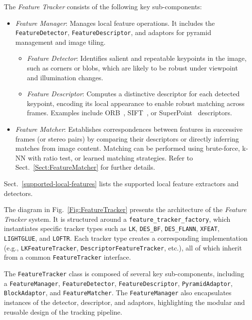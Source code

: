 \documentclass{article}
\begin{document}
The \textit{Feature Tracker} consists of the following key sub-components:

\begin{itemize} 
\item \textit{Feature Manager}: Manages local feature operations. It includes the \texttt{FeatureDetector}, \texttt{FeatureDescriptor}, and adaptors for pyramid management and image tiling. 
\begin{itemize}
\item \textit{Feature Detector}: Identifies salient and repeatable keypoints in the image, such as corners or blobs, which are likely to be robust under viewpoint and illumination changes. 

\item \textit{Feature Descriptor}: Computes a distinctive descriptor for each detected keypoint, encoding its local appearance to enable robust matching across frames. Examples include ORB~\cite{rublee2011orb}, SIFT~\cite{lowe1999object}, or SuperPoint~\cite{detone18superpoint} descriptors.

\end{itemize}

\item \textit{Feature Matcher}: Establishes correspondences between features in successive frames (or stereo pairs) by comparing their descriptors or directly inferring matches from image content. Matching can be performed using brute-force, k-NN with ratio test, or learned matching strategies. Refer to Sect.~\ref{Sect:FeatureMatcher} for further details.
\end{itemize}

Sect.~\ref{supported-local-features} lists the supported local feature extractors and detectors.

The diagram in Fig.~\ref{Fig:FeatureTracker} presents the architecture of the \textit{Feature Tracker} system. It is structured around a \texttt{feature\_tracker\_factory}, which instantiates specific tracker types such as \texttt{LK}, \texttt{DES\_BF}, \texttt{DES\_FLANN}, \texttt{XFEAT}\cite{barroso2024xfeat}, \texttt{LIGHTGLUE}\cite{lindenberger2023lightglue}, and \texttt{LOFTR}\cite{sun2021loftr}. Each tracker type creates a corresponding implementation (e.g., \texttt{LKFeatureTracker}, \texttt{DescriptorFeatureTracker}, etc.), all of which inherit from a common \texttt{FeatureTracker} interface.

The \texttt{FeatureTracker} class is composed of several key sub-components, including a \texttt{FeatureManager}, \texttt{FeatureDetector}, \texttt{FeatureDescriptor}, \texttt{PyramidAdaptor}, \texttt{BlockAdaptor}, and \texttt{FeatureMatcher}. The \texttt{FeatureManager} also encapsulates instances of the detector, descriptor, and adaptors, highlighting the modular and reusable design of the tracking pipeline.
\end{document}
